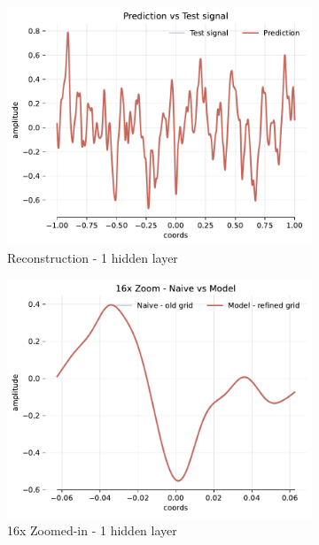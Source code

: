 \begin{figure}[!h]
    \begin{subfigure}[b]{0.32\textwidth}
        \centering
        \includegraphics[width=\textwidth]{img/ch3/pred-64hf-1hl-16w-sub3.pdf}
        \caption{Reconstruction - 1 hidden layer}
    \end{subfigure}
    \begin{subfigure}[b]{0.32\textwidth}
        \centering
        \includegraphics[width=\textwidth]{img/ch3/16x-64hf-1hl-16w-sub3.pdf}
        \caption{16x Zoomed-in - 1 hidden layer}
    \end{subfigure}
    \begin{subfigure}[b]{0.32\textwidth}

\end{subfigure}
\end{figure}
